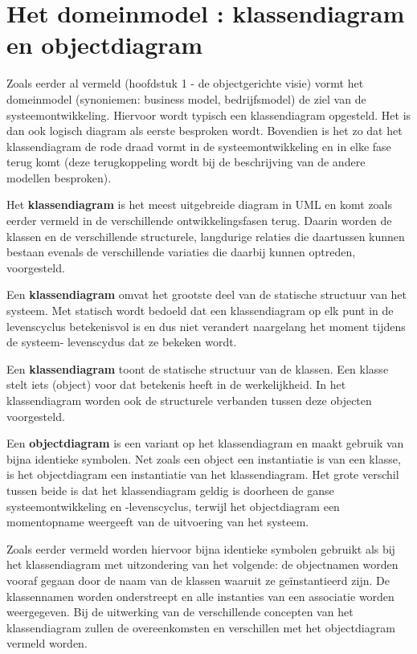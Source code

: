 \newpage
\section{Het domeinmodel : klassendiagram en objectdiagram}

Zoals eerder al vermeld (hoofdstuk 1 - de objectgerichte visie) vormt het domeinmodel (synoniemen: business model, bedrijfsmodel) de ziel van de systeemontwikkeling. Hiervoor wordt typisch een klassendiagram opgesteld. Het is dan ook logisch diagram als eerste besproken wordt. Bovendien is het zo dat het klassendiagram de rode draad vormt in de systeemontwikkeling en in elke fase terug komt (deze terugkoppeling wordt bij de beschrijving van de andere modellen besproken).

Het \textbf{klassendiagram} is het meest uitgebreide diagram in UML en komt zoals eerder vermeld in de verschillende ontwikkelingsfasen terug. Daarin worden de klassen en de verschillende structurele, langdurige relaties die daartussen kunnen bestaan evenals de verschillende variaties die daarbij kunnen optreden, voorgesteld.

Een \textbf{klassendiagram} omvat het grootste deel van de statische structuur van het systeem. Met statisch wordt bedoeld dat een klassendiagram op elk punt in de levenscyclus betekenisvol is en dus niet verandert naargelang het moment tijdens de systeem- levenscydus dat ze bekeken wordt.

Een \textbf{klassendiagram} toont de statische structuur van de klassen. Een klasse stelt iets (object) voor dat betekenis heeft in de werkelijkheid. In het klassendiagram worden ook de structurele verbanden tussen deze objecten voorgesteld.

Een \textbf{objectdiagram} is een variant op het klassendiagram en maakt gebruik van bijna identieke symbolen. Net zoals een object een instantiatie is van een klasse, is het objectdiagram een instantiatie van het klassendiagram.
Het grote verschil tussen beide is dat het klassendiagram geldig is doorheen de ganse systeemontwikkeling en -levenscyclus, terwijl het objectdiagram een momentopname weergeeft van de uitvoering van het systeem.

Zoals eerder vermeld worden hiervoor bijna identieke symbolen gebruikt als bij het klassendiagram met uitzondering van het volgende: de objectnamen worden vooraf gegaan door de naam van de klassen waaruit ze geïnstantieerd zijn. De klassennamen worden onderstreept en alle instanties van een associatie worden weergegeven. Bij de uitwerking van de verschillende concepten van het klassendiagram zullen de overeenkomsten en verschillen met het objectdiagram vermeld worden.

